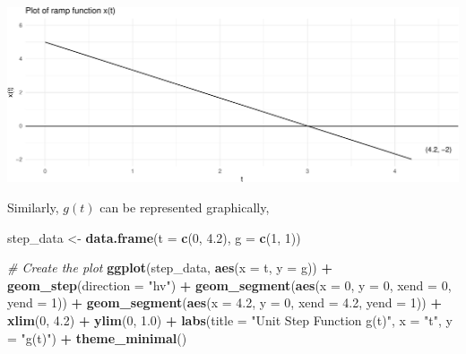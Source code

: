\documentclass[
]{article}
\newenvironment{Shaded}{\begin{snugshade}}{\end{snugshade}}
\newcommand{\AttributeTok}[1]{\textcolor[rgb]{0.13,0.29,0.53}{#1}}
\newcommand{\CommentTok}[1]{\textcolor[rgb]{0.56,0.35,0.01}{\textit{#1}}}
\newcommand{\DecValTok}[1]{\textcolor[rgb]{0.00,0.00,0.81}{#1}}
\newcommand{\FloatTok}[1]{\textcolor[rgb]{0.00,0.00,0.81}{#1}}
\newcommand{\FunctionTok}[1]{\textcolor[rgb]{0.13,0.29,0.53}{\textbf{#1}}}
\newcommand{\NormalTok}[1]{#1}
\newcommand{\OtherTok}[1]{\textcolor[rgb]{0.56,0.35,0.01}{#1}}
\newcommand{\SpecialCharTok}[1]{\textcolor[rgb]{0.81,0.36,0.00}{\textbf{#1}}}
\newcommand{\StringTok}[1]{\textcolor[rgb]{0.31,0.60,0.02}{#1}}
\begin{document}
\includegraphics{laplace_transform_files/figure-latex/plot-function2-1.pdf}

Similarly, \(g(t)\) can be represented graphically,

\begin{Shaded}
\begin{Highlighting}[]
\NormalTok{step\_data }\OtherTok{\textless{}{-}} \FunctionTok{data.frame}\NormalTok{(}\AttributeTok{t =} \FunctionTok{c}\NormalTok{(}\DecValTok{0}\NormalTok{, }\FloatTok{4.2}\NormalTok{),}
                        \AttributeTok{g =} \FunctionTok{c}\NormalTok{(}\DecValTok{1}\NormalTok{, }\DecValTok{1}\NormalTok{))}

\CommentTok{\# Create the plot}
\FunctionTok{ggplot}\NormalTok{(step\_data, }\FunctionTok{aes}\NormalTok{(}\AttributeTok{x =}\NormalTok{ t, }\AttributeTok{y =}\NormalTok{ g)) }\SpecialCharTok{+}
  \FunctionTok{geom\_step}\NormalTok{(}\AttributeTok{direction =} \StringTok{"hv"}\NormalTok{) }\SpecialCharTok{+} 
  \FunctionTok{geom\_segment}\NormalTok{(}\FunctionTok{aes}\NormalTok{(}\AttributeTok{x =} \DecValTok{0}\NormalTok{, }\AttributeTok{y =} \DecValTok{0}\NormalTok{, }\AttributeTok{xend =} \DecValTok{0}\NormalTok{, }\AttributeTok{yend =} \DecValTok{1}\NormalTok{)) }\SpecialCharTok{+} 
  \FunctionTok{geom\_segment}\NormalTok{(}\FunctionTok{aes}\NormalTok{(}\AttributeTok{x =} \FloatTok{4.2}\NormalTok{, }\AttributeTok{y =} \DecValTok{0}\NormalTok{, }\AttributeTok{xend =} \FloatTok{4.2}\NormalTok{, }\AttributeTok{yend =} \DecValTok{1}\NormalTok{)) }\SpecialCharTok{+} 
  \FunctionTok{xlim}\NormalTok{(}\DecValTok{0}\NormalTok{, }\FloatTok{4.2}\NormalTok{) }\SpecialCharTok{+}  
  \FunctionTok{ylim}\NormalTok{(}\DecValTok{0}\NormalTok{, }\FloatTok{1.0}\NormalTok{) }\SpecialCharTok{+}  
  \FunctionTok{labs}\NormalTok{(}\AttributeTok{title =} \StringTok{"Unit Step Function g(t)"}\NormalTok{, }\AttributeTok{x =} \StringTok{"t"}\NormalTok{, }\AttributeTok{y =} \StringTok{"g(t)"}\NormalTok{) }\SpecialCharTok{+} 
  \FunctionTok{theme\_minimal}\NormalTok{()}
\end{Highlighting}
\end{Shaded}
\end{document}
